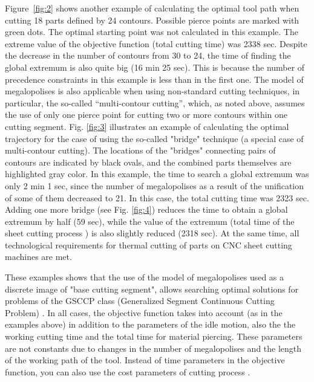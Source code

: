 Figure~\ref{fig:2} shows another example of calculating the optimal tool path when cutting 18 parts defined by 24 contours. Possible pierce points are marked with green dots. The optimal starting point was not calculated in this example.
The extreme value of the objective function (total cutting time) was 2338 sec. Despite the decrease in the number of contours from 30 to 24, the time of finding the global extremum is also quite big (16 min 25 sec). This is because the number of precedence constraints in this example is less than in the first one.
The model of megalopolises is also applicable  when using non-standard cutting techniques,
in particular, the so-called ``multi-contour cutting'', which, as noted above, assumes the use of only
one pierce point for cutting two or more contours within one cutting segment.
Fig. \ref{fig:3} illustrates an example of calculating the optimal trajectory for the case of using the so-called "bridge" technique
(a special case of multi-contour cutting). The locations of the "bridges" connecting pairs of contours are indicated by black ovals, and the combined parts themselves are highlighted gray color. In this example, the time to search a global extremum was only 2 min 1 sec, since the number of megalopolises as a result of the unification of some of them decreased to 21. In this case, the total cutting time was 2323 sec. Adding one more bridge
(see Fig. \ref{fig:4}) reduces the time to obtain a global extremum by half (59 sec), while the value of the extremum (total time of the sheet cutting process ) is also slightly reduced (2318 sec). At the same time, all technological requirements for thermal cutting of parts on CNC sheet cutting machines are met.

These examples shows that the use of the model of megalopolises used as a discrete image of "base cutting segment",
allows searching optimal solutions for problems of the GSCCP class (Generalized Segment Continuous Cutting Problem) \cite{bibx:112}. In all cases, the objective function takes into account (as in the examples above) in addition to the parameters of the idle motion, also the the working cutting time and the total time for material piercing. These parameters are not constants due to changes in the number of megalopolises and the length of the working path of the tool. Instead of time parameters in the objective function, you can also use the cost parameters of cutting process \cite{Tavaeva}.

